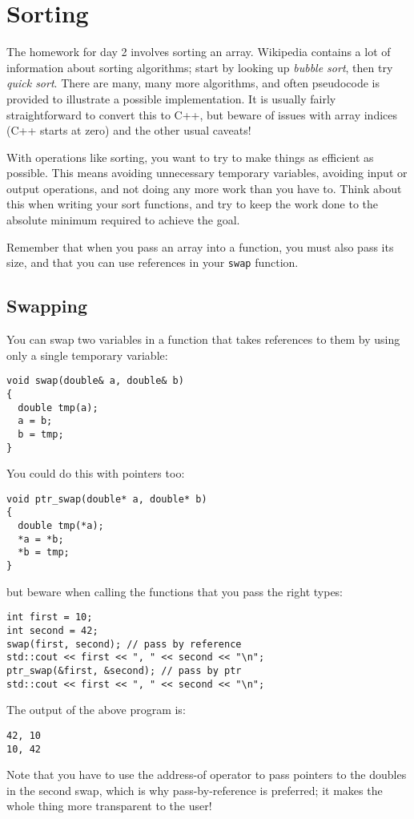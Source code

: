 \documentclass[a4paper]{scrartcl}
\begin{document}
\section{Sorting}
The homework for day 2 involves sorting an array. Wikipedia contains a lot of information about sorting algorithms; start by looking up \emph{bubble sort}, then try \emph{quick sort}. There are many, many more algorithms, and often pseudocode is provided to illustrate a possible implementation. It is usually fairly straightforward to convert this to C++, but beware of issues with array indices (C++ starts at zero) and the other usual caveats!

With operations like sorting, you want to try to make things as efficient as possible. This means avoiding unnecessary temporary variables, avoiding input or output operations, and not doing any more work than you have to. Think about this when writing your sort functions, and try to keep the work done to the absolute minimum required to achieve the goal.

Remember that when you pass an array into a function, you must also pass its size, and that you can use references in your \verb|swap| function.

\subsection{Swapping}
You can swap two variables in a function that takes references to them by using only a single temporary variable:
\begin{verbatim}
void swap(double& a, double& b)
{
  double tmp(a);
  a = b;
  b = tmp;
}
\end{verbatim}

You could do this with pointers too:
\begin{verbatim}
void ptr_swap(double* a, double* b)
{
  double tmp(*a);
  *a = *b;
  *b = tmp;
}
\end{verbatim}

but beware when calling the functions that you pass the right types:
\begin{verbatim}
int first = 10;
int second = 42;
swap(first, second); // pass by reference
std::cout << first << ", " << second << "\n";
ptr_swap(&first, &second); // pass by ptr
std::cout << first << ", " << second << "\n";
\end{verbatim}

The output of the above program is:
\begin{verbatim}
42, 10
10, 42
\end{verbatim}

Note that you have to use the address-of operator to pass pointers to the doubles in the second swap, which is why pass-by-reference is preferred; it makes the whole thing more transparent to the user!
\end{document}
